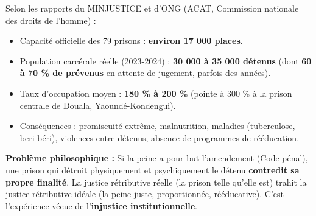 \documentclass[11pt]{article}
\begin{document}
\begin{savaistu}
Selon les rapports du MINJUSTICE et d'ONG (ACAT, Commission nationale des droits de l'homme) :
\begin{itemize}
    \item Capacité officielle des 79 prisons : \textbf{environ 17 000 places}.
    \item Population carcérale réelle (2023-2024) : \textbf{30 000 à 35 000 détenus} (dont \textbf{60 à 70 \% de prévenus} en attente de jugement, parfois des années).
    \item Taux d'occupation moyen : \textbf{180 \% à 200 \%} (pointe à 300 \% à la prison centrale de Douala, Yaoundé-Kondengui).
    \item Conséquences : promiscuité extrême, malnutrition, maladies (tuberculose, beri-béri), violences entre détenus, absence de programmes de rééducation.
\end{itemize}
\textbf{Problème philosophique :} Si la peine a pour but l'amendement (Code pénal), une prison qui détruit physiquement et psychiquement le détenu \textbf{contredit sa propre finalité}. La justice rétributive réelle (la prison telle qu'elle est) trahit la justice rétributive idéale (la peine juste, proportionnée, rééducative). C'est l'expérience vécue de l'\textbf{injustice institutionnelle}.
\end{savaistu}
\end{document}
